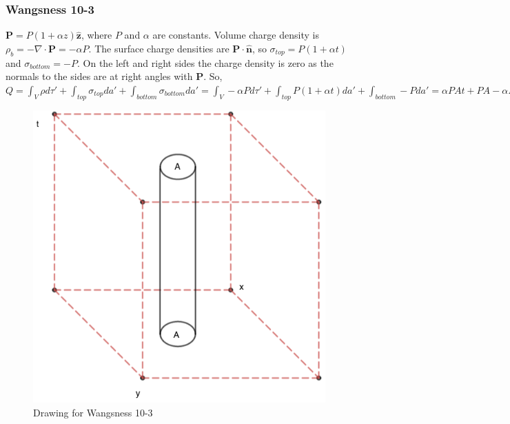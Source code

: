 \documentclass[crop=false,class=article,oneside]{standalone}
\begin{document}
        \subsubsection{Wangsness 10-3}
        $\mathbf{P}= P(1+\alpha z)\hat{\mathbf{z}}$, where $P$ and $\alpha$ are constants. Volume charge density is $\rho_{b} = -\nabla \cdot \mathbf{P} = -\alpha P$. The surface charge densities are $\mathbf{P}\cdot \hat{\mathbf{n}}$, so $\sigma_{top} = P(1+\alpha t)$ and $\sigma_{bottom} = -P$. On the left and right sides the charge density is zero as the normals to the sides are at right angles with $\mathbf{P}$. So, $Q = \int_{V} \rho d\tau' + \int_{top} \sigma_{top} da' + \int_{bottom} \sigma_{bottom} da' = \int_{V}-\alpha P d\tau' + \int_{top}P(1+\alpha t) da' + \int_{bottom} - Pda' = \alpha PAt + PA - \alpha PA t - PA = 0$
        \begin{figure}[htbp]
            \centering
            \captionsetup{type=figure}
            \includegraphics[scale=0.4]{10-3.png}
            \caption{Drawing for Wangsness 10-3}
        \end{figure}
\end{document}
